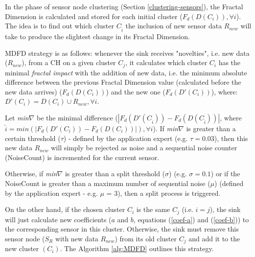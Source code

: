 \documentclass{acm_proc_article-sp}
\begin{document}
In the phase of sensor node clustering (Section \ref{clustering-sensors}), the
Fractal Dimension is calculated and stored for each initial cluster
($F_{d}(D(C_i)), \forall i$). The idea is to find out which cluster
$C_{\hat{i}}$ the inclusion of new sensor data $R_{new}$ will take to produce
the slightest change in its Fractal Dimension.


MDFD strategy is as follows:
whenever the sink receives "novelties", i.e. new data ($R_{new}$), from a CH on
a given cluster $C_j$, it calculates which cluster $C_i$ has the minimal
\textit{fractal impact} with the addition of new data, i.e. the minimum absolute
difference between the previous Fractal Dimension value (calculated before the
new data arrives) ($F_d(D(C_i))$) and the new one ($F_d(D'(C_i))$), where:
$D'(C_i) = D(C_i) \cup R_{new}, \forall i$.

Let {\it min}$\nabla$ be the minimal difference ($|F_d(D'(C_{\hat{i}})) -
F_d(D(C_{\hat{i}}))|$, where $\hat{i} = min(|F_d(D'(C_i)) - F_d(D(C_i))|),
\forall i$). If {\it min}$\nabla$ is greater than a certain threshold ($\tau$) -
defined by the application expert (e.g. $\tau = 0.03$), then this new data
$R_{new}$ will simply be rejected as noise and a sequential noise counter
(NoiseCount) is incremented for the current sensor.

Otherwise, if {\it min}$\nabla$ is greater than a split threshold ($\sigma$)
(e.g. $\sigma = 0.1$) or if the NoiseCount is greater than a maximum number of
sequential noise ($\mu$) (defined by the application expert - e.g. $\mu$ = 3),
then a split process is triggered.

On the other hand, if the chosen cluster $C_i$ is the same $C_j$ (i.e.
$i=j$), the sink will just calculate new coefficients ($a$ and $b$, equations
(\ref{coef-a}) and (\ref{coef-b})) to the corresponding sensor in this cluster.
Otherwise, the sink must remove this sensor node ($S_{R}$ with new data
$R_{new}$) from its old cluster $C_j$ and add it to the new cluster $(C_i)$.
The Algorithm \ref{alg:MDFD} outlines this strategy.
\end{document}
